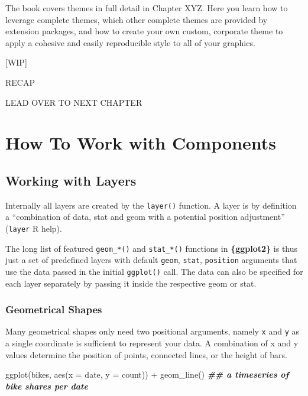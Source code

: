 \documentclass[
]{krantz}
\makeatletter
\newenvironment{Shaded}{\begin{snugshade}}{\end{snugshade}}
\newcommand{\AttributeTok}[1]{\textcolor[rgb]{0.61,0.61,0.61}{#1}}
\newcommand{\DocumentationTok}[1]{\textcolor[rgb]{0.37,0.37,0.37}{\textbf{\textit{#1}}}}
\newcommand{\FunctionTok}[1]{\textcolor[rgb]{0,0,0}{#1}}
\newcommand{\NormalTok}[1]{#1}
\newcommand{\SpecialCharTok}[1]{\textcolor[rgb]{0,0,0}{#1}}
\newenvironment{kframe}{%
\medskip{}
\setlength{\fboxsep}{.8em}
 \def\at@end@of@kframe{}%
 \ifinner\ifhmode%
  \def\at@end@of@kframe{\end{minipage}}%
  \begin{minipage}{\columnwidth}%
 \fi\fi%
 \def\FrameCommand##1{\hskip\@totalleftmargin \hskip-\fboxsep
 \colorbox{shadecolor}{##1}\hskip-\fboxsep
     \hskip-\linewidth \hskip-\@totalleftmargin \hskip\columnwidth}%
 \MakeFramed {\advance\hsize-\width
   \@totalleftmargin\z@ \linewidth\hsize
   \@setminipage}}%
 {\par\unskip\endMakeFramed%
 \at@end@of@kframe}
\renewenvironment{Shaded}{\begin{kframe}}{\end{kframe}}
\makeatother
\begin{document}
The book covers themes in full detail in Chapter XYZ. Here you learn how to leverage complete themes, which other complete themes are provided by extension packages, and how to create your own custom, corporate theme to apply a cohesive and easily reproducible style to all of your graphics.

{[}WIP{]}

RECAP

LEAD OVER TO NEXT CHAPTER

\hypertarget{part-how-to-work-with-components}{%
\part{How To Work with Components}\label{part-how-to-work-with-components}}

\hypertarget{working-with-layers}{%
\chapter{Working with Layers}\label{working-with-layers}}

Internally all layers are created by the \texttt{layer()} function. A layer is by definition a ``combination of data, stat and geom with a potential position adjustment'' (\texttt{layer} R help).

The long list of featured \texttt{geom\_*()} and \texttt{stat\_*()} functions in \textbf{\{ggplot2\}} is thus just a set of predefined layers with default \texttt{geom}, \texttt{stat}, \texttt{position} arguments that use the data passed in the initial \texttt{ggplot()} call. The data can also be specified for each layer separately by passing it inside the respective geom or stat.

\hypertarget{geometrical-shapes}{%
\section{Geometrical Shapes}\label{geometrical-shapes}}

Many geometrical shapes only need two positional arguments, namely \texttt{x} and \texttt{y} as a single coordinate is sufficient to represent your data. A combination of x and y values determine the position of points, connected lines, or the height of bars.

\begin{Shaded}
\begin{Highlighting}[]
\FunctionTok{ggplot}\NormalTok{(bikes, }\FunctionTok{aes}\NormalTok{(}\AttributeTok{x =}\NormalTok{ date, }\AttributeTok{y =}\NormalTok{ count)) }\SpecialCharTok{+}
  \FunctionTok{geom\_line}\NormalTok{() }\DocumentationTok{\#\# a timeseries of bike shares per date}
\end{Highlighting}
\end{Shaded}
\end{document}
